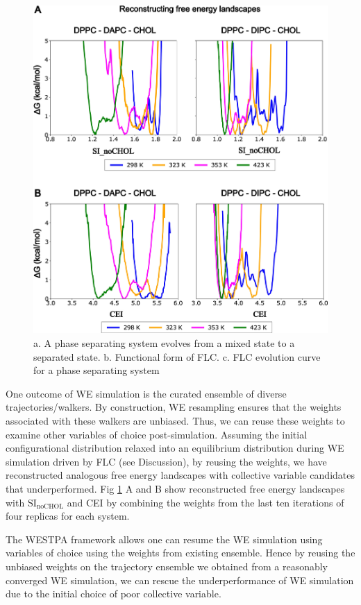 \documentclass{biophys-new}
\begin{document}
\begin{figure}[hbt!]
\centering
\includegraphics[width=0.75\linewidth]{Figures/Main/6/placeholder.jpg}
\caption{a. A phase separating system evolves from a mixed state to a separated state. b. Functional form of FLC. c. FLC evolution curve for a phase separating system}
\label{figs6:view}
\end{figure}

One outcome of WE simulation is the curated ensemble of diverse trajectories/walkers.
By construction, WE resampling ensures that the weights associated with these walkers are unbiased.
Thus, we can reuse these weights to examine other variables of choice post-simulation.
Assuming the initial configurational distribution relaxed into an equilibrium distribution during WE simulation driven by FLC (see Discussion), 
by reusing the weights, we have reconstructed analogous free energy landscapes with collective variable candidates that underperformed.
Fig \ref{figs6:view} A and B show reconstructed free energy landscapes with $\text{SI}_{\text{noCHOL}}$ and CEI by combining the weights from the last ten iterations of four replicas for each system.

The WESTPA framework allows one can resume the WE simulation using variables of choice using the weights from existing ensemble\cite{Zhang2010, Zwier2015}.
Hence by reusing the unbiased weights on the trajectory ensemble we obtained from a reasonably converged WE simulation,
we can rescue the underperformance of WE simulation due to the initial choice of poor collective variable.
\end{document}
